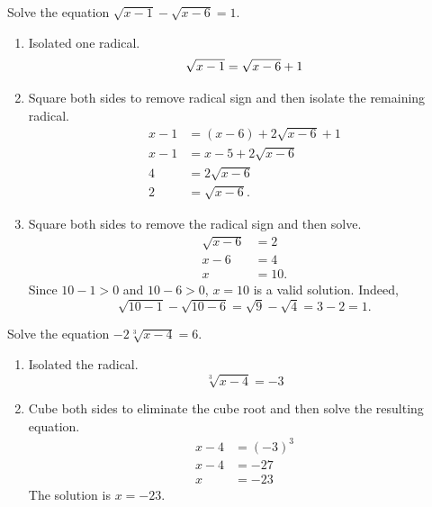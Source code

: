 \documentclass[en,12pt]{elegantbook}
\providecommand{\tightlist}{%
  \setlength{\itemsep}{0pt}\setlength{\parskip}{0pt}}
\providecommand{\tightlist}{%
  \setlength{\itemsep}{0pt}\setlength{\parskip}{0pt}}
\let\BeginKnitrBlock\begin \let\EndKnitrBlock\end
\begin{document}
\BeginKnitrBlock{example}
\protect\hypertarget{exm:unnamed-chunk-158}{}{\label{exm:unnamed-chunk-158} }
Solve the equation \(\sqrt{x-1}-\sqrt{x-6}=1.\)
\EndKnitrBlock{example}

\BeginKnitrBlock{solution}


\begin{enumerate}
\def\labelenumi{\arabic{enumi}.}
\tightlist
\item
  Isolated one radical.
  \[
     \sqrt{x-1}=\sqrt{x-6}+1\\
  \]
\item
  Square both sides to remove radical sign and then isolate the remaining radical.
  \[
     \begin{aligned}
         x-1&=(x-6)+2\sqrt{x-6}+1\\
         x-1&=x-5+2\sqrt{x-6}\\
         4&=2\sqrt{x-6}\\
         2&=\sqrt{x-6}.
     \end{aligned}
  \]
\item
  Square both sides to remove the radical sign and then solve.
  \[
     \begin{aligned}
         \sqrt{x-6}&=2\\
         x-6&=4\\
         x&=10.
     \end{aligned}
  \]
  Since \(10-1>0\) and \(10-6>0\), \(x=10\) is a valid solution. Indeed,
  \[
     \sqrt{10-1}-\sqrt{10-6}=\sqrt{9}-\sqrt{4}=3-2=1.
  \]
\end{enumerate}
\EndKnitrBlock{solution}

\BeginKnitrBlock{example}
\protect\hypertarget{exm:unnamed-chunk-160}{}{\label{exm:unnamed-chunk-160} }
Solve the equation \(-2\sqrt[3]{x-4}=6.\)
\EndKnitrBlock{example}

\BeginKnitrBlock{solution}


\begin{enumerate}
\def\labelenumi{\arabic{enumi}.}
\tightlist
\item
  Isolated the radical.
  \[
     \sqrt[3]{x-4}=-3
  \]
\item
  Cube both sides to eliminate the cube root and then solve the resulting equation.
  \[
     \begin{aligned}
         x-4&=(-3)^3\\
         x-4&=-27\\
         x&=-23
     \end{aligned}
  \]
  The solution is \(x=-23\).
\end{enumerate}
\EndKnitrBlock{solution}
\end{document}
